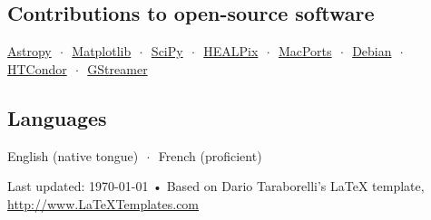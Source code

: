 \documentclass[10pt, letterpaper]{article} %
\newcommand{\listsep}{$\,\cdot\,$}
\begin{document}
\subsection*{Contributions to open-source software}

\href{http://www.astropy.org}{Astropy} \listsep{} \href{http://matplotlib.org}{Matplotlib} \listsep{} \href{http://www.scipy.org}{SciPy} \listsep{} \href{http://healpix.jpl.nasa.gov}{HEALPix} \listsep{} \href{http://www.macports.org/}{MacPorts} \listsep{} \href{https://www.debian.org}{Debian} \listsep{} \href{http://research.cs.wisc.edu/htcondor/}{HTCondor} \listsep{} \href{http://gstreamer.net}{GStreamer}

\subsection*{Languages}

English (native tongue) \listsep{} French (proficient)

\vfill{} %


\begin{center}
{\scriptsize Last updated: \today\- •\- Based on Dario Taraborelli's LaTeX template, \href{http://www.LaTeXTemplates.com}{http://www.LaTeXTemplates.com}} %
\end{center}

\end{document}
